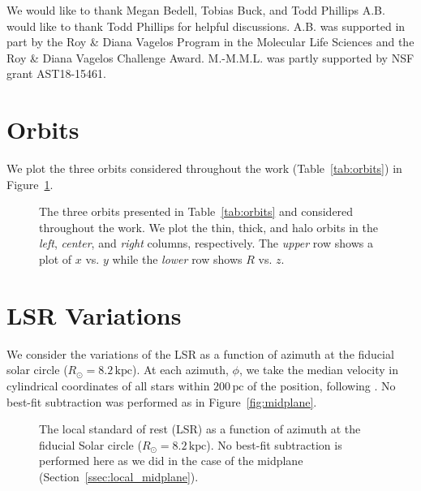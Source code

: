 \documentclass[twocolumn]{aastex62}
\newcommand{\Gus}[1]{\textcolor{red}{#1}}
\newcommand{\pc}{\text{pc}}
\newcommand{\kpc}{\text{kpc}}
\begin{document}
\acknowledgments
We would like to thank Megan Bedell, Tobias Buck, and Todd Phillips
A.B. would like to thank Todd Phillips
for helpful discussions. A.B. was supported in part by the Roy \& Diana
Vagelos Program in the Molecular Life Sciences and the Roy \& Diana Vagelos
Challenge Award. 
M.-M.M.L. was partly supported by NSF grant AST18-15461.

\appendix
\section{Orbits} \label{app:orbits}
We plot the three orbits considered throughout the work
(Table~\ref{tab:orbits}) in Figure~\ref{fig:plot_orbits}.

\begin{figure}
\caption{The three orbits presented in Table~\ref{tab:orbits} and considered
throughout the work. We plot the thin, thick, and halo orbits in the {\em
left}, {\em center}, and {\em right} columns, respectively. The {\em upper}
row shows a plot of $x$ vs. $y$ while the {\em lower} row shows $R$ vs. $z$.}
\label{fig:plot_orbits}
\end{figure}

\section{LSR Variations} \label{app:lsr}
We consider the variations of the LSR as a function of azimuth at the fiducial
solar circle ($R_{\odot} = 8.2\,\kpc$). At each azimuth, $\phi$, we take the
median velocity in cylindrical coordinates of all stars within $200\,\pc$ of
the position, following \citet{2018arXiv180610564S}. No best-fit subtraction
was performed as in Figure~\ref{fig:midplane}.

\begin{figure}
\caption{The local standard of rest (LSR) as a function of azimuth at the
fiducial Solar circle ($R_{\odot} = 8.2\,\kpc$). No best-fit subtraction is
performed here as we did in the case of the midplane
(Section~\ref{ssec:local_midplane}).}
\end{figure}


\end{document}
